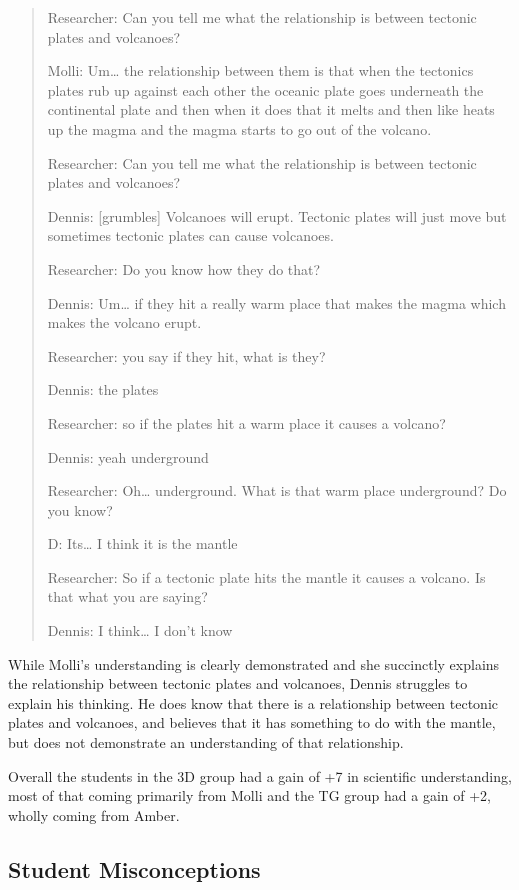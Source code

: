 \documentclass[11.5pt]{sig-alternate} %
\begin{document}
\begin{large}
\begin{quote}

Researcher:  Can you tell me what the relationship is between tectonic plates and volcanoes?

Molli:  Um… the relationship between them is that when the tectonics plates rub up against each other the oceanic plate goes underneath the continental plate and then when it does that it melts and then like heats up the magma and the magma starts to go out of the volcano.

Researcher:  Can you tell me what the relationship is between tectonic plates and volcanoes?

Dennis:  [grumbles] Volcanoes will erupt.  Tectonic plates will just move but sometimes tectonic plates can cause volcanoes.

Researcher:  Do you know how they do that?

Dennis:  Um… if they hit a really warm place that makes the magma which makes the volcano erupt.  

Researcher:  you say if they hit, what is they?

Dennis:  the plates

Researcher:  so if the plates hit a warm place it causes a volcano?

Dennis:  yeah underground

Researcher:  Oh… underground.  What is that warm place underground?  Do you know?

D:  Its… I think it is the mantle

Researcher: So if a tectonic plate hits the mantle it causes a volcano.  Is that what you are saying?

Dennis:  I think… I don’t know

\end{quote}

While Molli’s understanding is clearly demonstrated and she succinctly explains the relationship between tectonic plates and volcanoes, Dennis struggles to explain his thinking.  He does know that there is a relationship between tectonic plates and volcanoes, and believes that it has something to do with the mantle, but does not demonstrate an understanding of that relationship.  

Overall the students in the 3D group had a gain of +7 in scientific understanding, most of that coming primarily from Molli and the TG group had a gain of +2, wholly coming from Amber.  

\subsection*{Student Misconceptions}


\end{large}
\end{document}
